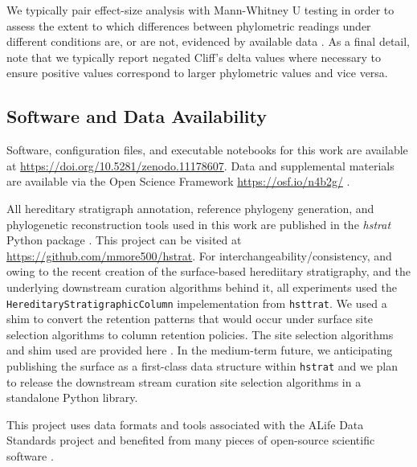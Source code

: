 We typically pair effect-size analysis with Mann-Whitney U testing in order to assess the extent to which differences between phylometric readings under different conditions are, or are not, evidenced by available data \citep{mann1947on}.
As a final detail, note that we typically report negated Cliff's delta values where necessary to ensure positive values correspond to larger phylometric values and vice versa.

\subsection{Software and Data Availability}

Software, configuration files, and executable notebooks for this work are available at \url{https://doi.org/10.5281/zenodo.11178607}.
Data and supplemental materials are available via the Open Science Framework \url{https://osf.io/n4b2g/} \citep{foster2017open}.

All hereditary stratigraph annotation, reference phylogeny generation, and phylogenetic reconstruction tools used in this work are published in the \textit{hstrat} Python package \citep{moreno2022hstrat}.
This project can be visited at \url{https://github.com/mmore500/hstrat}.
For interchangeability/consistency, and owing to the recent creation of the surface-based herediitary stratigraphy, and the underlying downstream curation algorithms behind it, all experiments used the \texttt{HereditaryStratigraphicColumn} impelementation from \texttt{hsttrat}.
We used a shim to convert the retention patterns that would occur under surface site selection algorithms to column retention policies.
The site selection algorithms and shim used are provided here \citep{moreno2024hsurf}.
In the medium-term future, we anticipating publishing the surface as a first-class data structure within \texttt{hstrat} and we plan to release the downstream stream curation site selection algorithms in a standalone Python library.

This project uses data formats and tools associated with the ALife Data Standards project \citep{lalejini2019data} and benefited from many pieces of open-source scientific software \citep{ofria2020empirical,sand2014tqdist,2020SciPy-NMeth,harris2020array,reback2020pandas,mckinney-proc-scipy-2010,sukumaran2010dendropy,cock2009biopython,dolson2024phylotrackpy,torchiano2016effsize,waskom2021seaborn,hunter2007matplotlib,moreno2024apc,moreno2024qspool,moreno2023teeplot,hagen2021gen3sis,ofria2004avida,torchiano2016effsize}. %